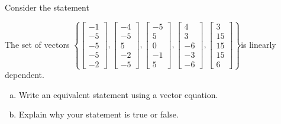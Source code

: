 
\begin{exerciseStatement}


Consider the statement 
\begin{center}\begin{minipage}{0.8\textwidth}
 The set of vectors \( \left\{ \left[\begin{array}{c}
-1 \\
-5 \\
-5 \\
-5 \\
-2
\end{array}\right] , \left[\begin{array}{c}
-4 \\
-5 \\
5 \\
-2 \\
-5
\end{array}\right] , \left[\begin{array}{c}
-5 \\
5 \\
0 \\
-1 \\
5
\end{array}\right] , \left[\begin{array}{c}
4 \\
3 \\
-6 \\
-3 \\
-6
\end{array}\right] , \left[\begin{array}{c}
3 \\
15 \\
15 \\
15 \\
6
\end{array}\right] \right\} \)is linearly dependent.
\end{minipage}\end{center}
    


\begin{enumerate}[(a)]
\item  Write an equivalent statement using a vector equation.
\item  Explain why your statement is true or false.
\end{enumerate}
    
\end{exerciseStatement}
    
